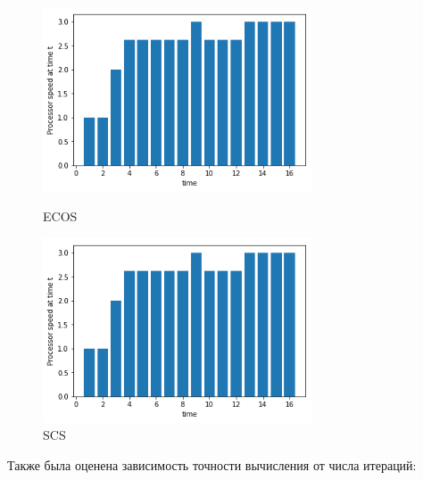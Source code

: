 \documentclass{article}
\begin{document}
\begin{figure}[h]
\begin{center}
\begin{minipage}[h]{8cm}
\includegraphics[width=8cm]{ECOS_3.png}
\caption{ECOS} %
\label{ris:experimoriginal} %
\end{minipage}
\hfill 
\begin{minipage}[h]{8cm}
\includegraphics[width=8cm]{SCS_3.png}
\caption{SCS}
\label{ris:experimcoded}
\end{minipage}
\end{center}
\end{figure}

Также была оценена зависимость точности вычисления от числа итераций:\\
\end{document}
